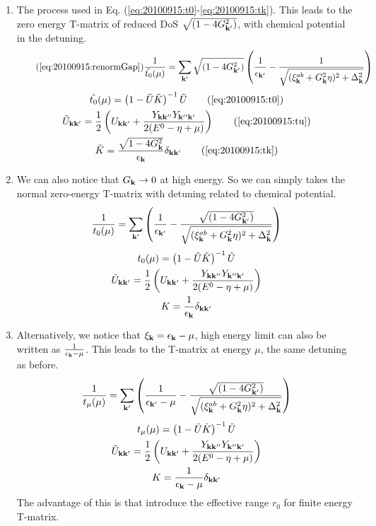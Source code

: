 \begin{enumerate}
\item The process used in Eq. (\ref{eq:20100915:t0}-\ref{eq:20100915:tk}).  This leads to the zero energy T-matrix of reduced DoS $\sqrt{(1-4G_{\mathbf{k}'}^{2})}$, with chemical potential in the detuning.  
\begin{equation}\tag{\ref{eq:20100915:renormGap}}
\nth{\tilde{t_{0}}(\mu)}=\sum_{\vk'}\sqrt{(1-4G_{\vk'}^{2})}
\br{\nth{\epsilon_{\vk'}}-\nth{\sqrt{{(\xi^{ab}_{\vk}+  G_{\vk}^2\eta)^{2}+\Delta_{\vk}^{2}}}}}
\end{equation}
\begin{gather}
\tilde{t_{0}}(\mu)=\br{1-\tilde{U}\tilde{ K}}^{-1}\tilde{U}\tag{\ref{eq:20100915:t0}}\\
\tilde{U}_{\vk\vk'}=\nth{2} \br{U_{\vk\vk'}+\frac{Y_{\vk\vk''}Y_{\vk''\vk'}}{2(E^{0}-\eta+\mu)}}\tag{\ref{eq:20100915:tu}}\\
\tilde{K}=\frac{\sqrt{1-4G_{\vk}^{2}}}{\epsilon_{\vk}}\delta_{\vk\vk'}\tag{\ref{eq:20100915:tk}}
\end{gather}
\item We can also notice that $G_{\mathbf{k}}\rightarrow0$ at high energy.  So we can simply takes the normal zero-energy T-matrix with detuning related to chemical potential.  
\begin{equation}\label{eq:20101004:renormGap1}
\frac{1}{{t_{0}}(\mu)}=\sum_{\mathbf{k}'}
\left(\frac{1}{\epsilon_{\mathbf{k}'}}-\frac{\sqrt{(1-4G_{\mathbf{k}'}^{2})}}{\sqrt{{(\xi^{ab}_{\mathbf{k}}+  G_{\mathbf{k}}^2\eta)^{2}+\Delta_{\mathbf{k}}^{2}}}}\right)
\end{equation} 
\begin{gather}
{t_{0}}(\mu)=\left(1-\tilde{U}\tilde{ K}\right)^{-1}\tilde{U}\label{eq:20101004:t01}\\
\tilde{U}_{\mathbf{k}\mathbf{k}'}=\frac{1}{2} \left(U_{\mathbf{k}\mathbf{k}'}+\frac{Y_{\mathbf{k}\mathbf{k}''}Y_{\mathbf{k}''\mathbf{k}'}}{2(E^{0}-\eta+\mu)}\right)\label{eq:20101004:tu1}\\
{K}=\frac{1}{\epsilon_{\mathbf{k}}}\delta_{\mathbf{k}\mathbf{k}'}\label{eq:20101004:tk1}
\end{gather}

\item  Alternatively, we notice that $\xi_{\mathbf{k}}=\epsilon_{\mathbf{k}}-\mu$, high energy limit can also be written as 
$\frac{1}{\epsilon_{\mathbf{k}}-\mu}$.  This leads to the T-matrix at energy $\mu$, the same detuning as before.  
\begin{equation}\label{eq:20101004:renormGap2}
\frac{1}{{t_{\mu}}(\mu)}=\sum_{\mathbf{k}'}
\left(\frac{1}{\epsilon_{\mathbf{k}'}-\mu}-\frac{\sqrt{(1-4G_{\mathbf{k}'}^{2})}}{\sqrt{{(\xi^{ab}_{\mathbf{k}}+  G_{\mathbf{k}}^2\eta)^{2}+\Delta_{\mathbf{k}}^{2}}}}\right)
\end{equation} 
\begin{gather}
{t_{\mu}}(\mu)=\left(1-\tilde{U}\tilde{ K}\right)^{-1}\tilde{U}\label{eq:20101004:t02}\\
\tilde{U}_{\mathbf{k}\mathbf{k}'}=\frac{1}{2} \left(U_{\mathbf{k}\mathbf{k}'}+\frac{Y_{\mathbf{k}\mathbf{k}''}Y_{\mathbf{k}''\mathbf{k}'}}{2(E^{0}-\eta+\mu)}\right)\label{eq:20101004:tu2}\\
{K}=\frac{1}{\epsilon_{\mathbf{k}}-\mu}\delta_{\mathbf{k}\mathbf{k}'}\label{eq:20101004:tk2}
\end{gather}
The advantage of this is that introduce the effective range $r_{0}$ for finite energy T-matrix. 
\end{enumerate}

